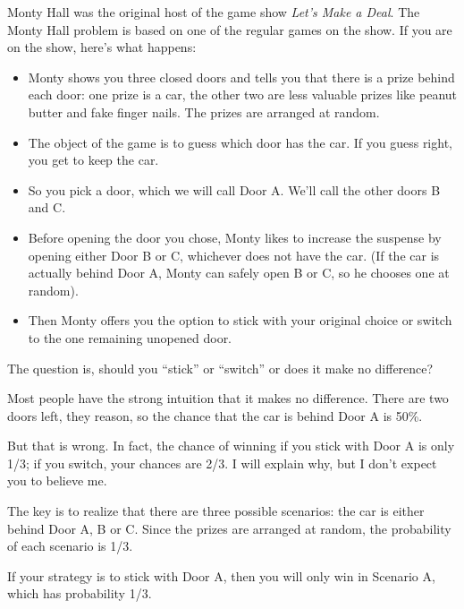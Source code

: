 \documentclass[12pt]{book}
\begin{document}
Monty Hall was the original host of the game show {\em Let's Make a
Deal}.  The Monty Hall problem is based on one of the regular
games on the show.  If you are on the show, here's what happens:

\begin{itemize}

\item Monty shows you three closed doors and tells you that there is a
  prize behind each door: one prize is a car, the other two are less
  valuable prizes like peanut butter and fake finger nails.  The
  prizes are arranged at random.

\item The object of the game is to guess which door has the car.  If
  you guess right, you get to keep the car.

\item So you pick a door, which we will call Door A.  We'll call the
  other doors B and C.

\item Before opening the door you chose, Monty likes to increase the
  suspense by opening either Door B or C, whichever does not
  have the car.  (If the car is actually behind Door A, Monty can
  safely open B or C, so he chooses one at random).

\item Then Monty offers you the option to stick with your original
  choice or switch to the one remaining unopened door.

\end{itemize}

The question is, should you ``stick'' or ``switch'' or does it
make no difference?


Most people have the strong intuition that it makes no difference.
There are two doors left, they reason, so the chance that the car
is behind Door A is 50\%.

But that is wrong.  In fact, the chance of winning if you stick
with Door A is only 1/3; if you switch, your chances are 2/3.
I will explain why, but I don't expect you to believe me.

The key is to realize that there are three possible scenarios:
the car is either behind Door A, B or C.  Since the prizes are
arranged at random, the probability of each scenario is 1/3.

If your strategy is to stick with Door A, then you will only
win in Scenario A, which has probability 1/3.
\end{document}
